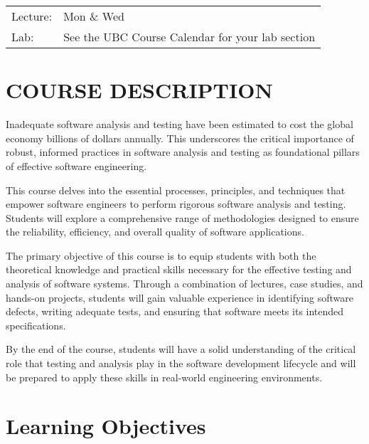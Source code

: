 \documentclass [11pt]{article}
\begin{document}
\begin{tabular}{l l}
     Lecture:  & Mon \& Wed\\
     Lab: & See the UBC Course Calendar for your lab section


  \end{tabular}



\section*{COURSE DESCRIPTION}

Inadequate software analysis and testing have been estimated to cost the global economy billions of dollars annually. This underscores the critical importance of robust, informed practices in software analysis and testing as foundational pillars of effective software engineering.

This course delves into the essential processes, principles, and techniques that empower software engineers to perform rigorous software analysis and testing. Students will explore a comprehensive range of methodologies designed to ensure the reliability, efficiency, and overall quality of software applications.

The primary objective of this course is to equip students with both the theoretical knowledge and practical skills necessary for the effective testing and analysis of software systems. Through a combination of lectures, case studies, and hands-on projects, students will gain valuable experience in identifying software defects, writing adequate tests, and ensuring that software meets its intended specifications.

By the end of the course, students will have a solid understanding of the critical role that testing and analysis play in the software development lifecycle and will be prepared to apply these skills in real-world engineering environments.



\section*{Learning Objectives}
\end{document}
